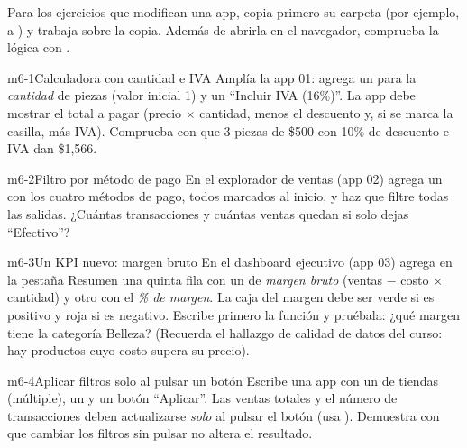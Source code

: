 Para los ejercicios que modifican una app, copia primero su carpeta (por
ejemplo,  a
) y trabaja sobre la copia. Además de
abrirla en el navegador, comprueba la lógica con .

\begin{ejercicio}{m6-1}{Calculadora con cantidad e IVA}
Amplía la app 01: agrega un  para la
\emph{cantidad} de piezas (valor inicial 1) y un 
``Incluir IVA (16\%)''. La app debe mostrar el total a pagar
(precio $\times$ cantidad, menos el descuento y, si se marca la casilla,
más IVA). Comprueba con  que 3 piezas de \$500 con
10\% de descuento e IVA dan \$1,566.
\end{ejercicio}

\begin{ejercicio}{m6-2}{Filtro por método de pago}
En el explorador de ventas (app 02) agrega un
 con los cuatro métodos de pago, todos
marcados al inicio, y haz que filtre todas las salidas. ¿Cuántas
transacciones y cuántas ventas quedan si solo dejas ``Efectivo''?
\end{ejercicio}

\begin{ejercicio}{m6-3}{Un KPI nuevo: margen bruto}
En el dashboard ejecutivo (app 03) agrega en la pestaña Resumen una quinta
fila con un  de \emph{margen bruto}
(ventas $-$ costo $\times$ cantidad) y otro con el \emph{\% de margen}. La
caja del margen debe ser verde si es positivo y roja si es negativo.
Escribe primero la función  y pruébala: ¿qué
margen tiene la categoría Belleza? (Recuerda el hallazgo de calidad de datos
del curso: hay productos cuyo costo supera su precio).
\end{ejercicio}

\begin{ejercicio}{m6-4}{Aplicar filtros solo al pulsar un botón}
Escribe una app con un  de tiendas (múltiple), un
 y un botón ``Aplicar''. Las ventas totales y el
número de transacciones deben actualizarse \emph{solo} al pulsar el botón
(usa ). Demuestra con  que
cambiar los filtros sin pulsar no altera el resultado.
\end{ejercicio}

